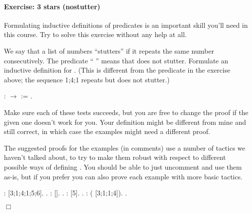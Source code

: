 \documentclass[12pt]{report}
\begin{document}
\paragraph{Exercise: 3 stars (nostutter)}

 Formulating inductive definitions of predicates is an important
    skill you'll need in this course.  Try to solve this exercise
    without any help at all.


    We say that a list of numbers ``stutters'' if it repeats the same
    number consecutively.  The predicate `` '' means
    that  does not stutter.  Formulate an inductive definition
    for .  (This is different from the 
    predicate in the exercise above; the sequence 1;4;1 repeats but
    does not stutter.) \begin{coqdoccode}
\coqdocemptyline
\coqdocnoindent
{} :    \ensuremath{\rightarrow}  :=\coqdoceol
\coqdocindent{0.50em}
\coqdoceol
\coqdocnoindent
.\coqdoceol
\coqdocemptyline
\end{coqdoccode}
Make sure each of these tests succeeds, but you are free
    to change the proof if the given one doesn't work for you.
    Your definition might be different from mine and still correct,
    in which case the examples might need a different proof.


    The suggested proofs for the examples (in comments) use a number
    of tactics we haven't talked about, to try to make them robust
    with respect to different possible ways of defining .
    You should be able to just uncomment and use them as-is, but if
    you prefer you can also prove each example with more basic
    tactics.  \begin{coqdoccode}
\coqdocemptyline
\coqdocnoindent
{} :       [3;1;4;1;5;6].\coqdoceol
 .\coqdoceol
\coqdocemptyline
\coqdocnoindent
{} :   [].\coqdoceol
 .\coqdoceol
\coqdocemptyline
\coqdocnoindent
{} :   [5].\coqdoceol
 .\coqdoceol
\coqdocemptyline
\coqdocnoindent
{} :       ( [3;1;1;4]).\coqdoceol
 .\coqdoceol
\end{coqdoccode}
\ensuremath{\Box} 
\end{document}
